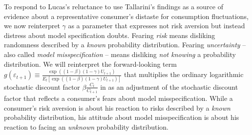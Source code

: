 To respond to  Lucas's reluctance to use  Tallarini's findings as a source of evidence about  a
representative consumer's distaste for  consumption fluctuations,  we now reinterpret $\gamma$ as a parameter that expresses not risk aversion but instead distress about
model specification doubts. Fearing {\it risk\/} means disliking randomness described by a {\it known\/} probability distribution.  Fearing {\it uncertainty\/}
-- also called  {\it model misspecification\/} --  means disliking {\it not knowing\/} a
probability distribution.
%
%
We will reinterpret the forward-looking term  $ g(\varepsilon_{t+1}) \equiv {\frac{\exp \left( \left(
1-\beta \right) \left( 1-\gamma \right) U_{t+1}\right) }{E_{t}\left[
\exp \left( \left( 1-\beta \right) \left( 1-\gamma \right)
U_{t+1}\right) \right] }}$ that multiplies the ordinary logarithmic
stochastic discount factor $\beta {\frac{C_{t}}{C_{t+1}}}$ in  as an
adjustment of the stochastic discount factor  that reflects a consumer's fears about model
misspecification.  While a consumer's risk aversion is about  his reaction to risks described by a {\it known\/} probability distribution,
his attitude about model misspecification is about his reaction to facing  an {\it unknown\/} probability distribution.
%
%

